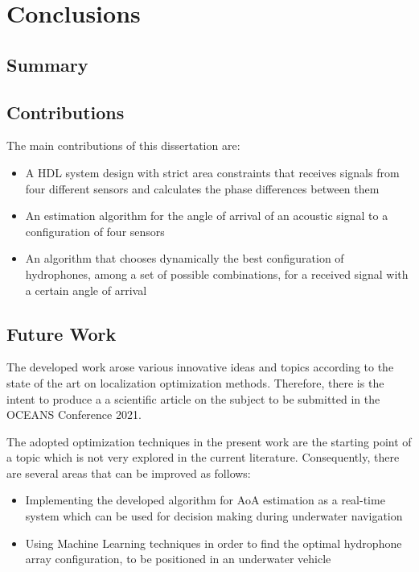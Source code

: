 \chapter{Conclusions}  \label{chap:conclusion}

\section{Summary}

\section{Contributions }

The main contributions of this dissertation are: 
\begin{itemize}
	\item A HDL system design with strict area constraints that receives signals from four different sensors and calculates the phase differences between them
	\item An estimation algorithm for the angle of arrival of an acoustic signal to a configuration of four sensors
	\item An algorithm that chooses dynamically the best configuration of hydrophones, among a set of possible combinations, for a received signal with a certain angle of arrival
\end{itemize}

\section{Future Work}

The developed work arose various innovative ideas and topics according to the state of the art on localization optimization methods. Therefore, there is the intent to produce a a scientific article on the subject to be submitted in the OCEANS Conference 2021.

The adopted optimization techniques in the present work are the starting point of a topic which is not very explored in the current literature. Consequently, there are several areas that can be improved as follows:

\begin{itemize}
	\item Implementing the developed algorithm for AoA estimation as a real-time system which can be used for decision making during underwater navigation
	\item Using Machine Learning techniques in order to find the optimal hydrophone array configuration, to be positioned in an underwater vehicle
\end{itemize}